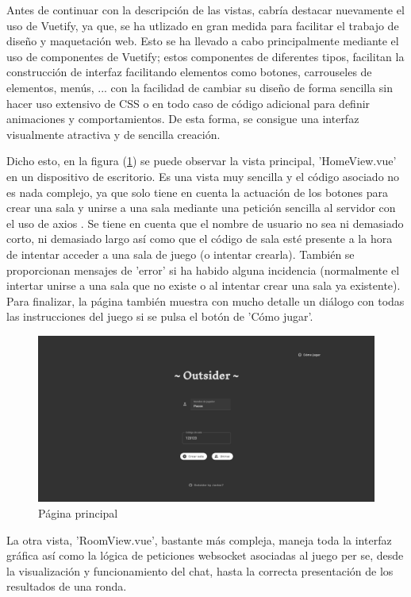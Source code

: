 Antes de continuar con la descripción de las vistas, cabría destacar nuevamente el uso de Vuetify, ya que, se ha utlizado en gran medida para facilitar 
el trabajo de diseño y maquetación web. Esto se ha llevado a cabo principalmente mediante el uso de componentes de Vuetify; estos componentes de diferentes tipos, facilitan la
construcción de interfaz facilitando elementos como botones, carrouseles de elementos, menús, ... con la facilidad de cambiar su diseño de forma sencilla sin hacer uso
extensivo de CSS o en todo caso de código adicional para definir animaciones y comportamientos. De esta forma, se consigue una interfaz visualmente atractiva y de sencilla
creación.

Dicho esto, en la figura (\ref{fig:res_mainpage}) se puede observar la vista principal, 'HomeView.vue' en un dispositivo de escritorio. Es una vista muy sencilla y el código asociado no
es nada complejo, ya que solo tiene en cuenta la actuación de los botones para crear una sala y unirse a una sala mediante una petición sencilla al servidor con el uso de axios \cite{vueAxios}. 
Se tiene en cuenta que el nombre de usuario no sea ni demasiado corto, ni demasiado largo así como que el código de sala esté presente a la hora de intentar acceder a una sala de juego 
(o intentar crearla). También se proporcionan mensajes de 'error' si ha habido alguna incidencia (normalmente el intertar unirse a una sala que no existe o al intentar crear una sala ya existente). 
Para finalizar, la página también muestra con mucho detalle un diálogo con todas las instrucciones del juego si se pulsa el botón de 'Cómo jugar'.

\begin{figure}[h]
	\centering
	\includegraphics[width=\textwidth,clip=true]{res_mainpage.png}
	\caption{Página principal}
	\label{fig:res_mainpage}
\end{figure}

La otra vista, 'RoomView.vue', bastante más compleja, maneja toda la interfaz gráfica así como la lógica de peticiones websocket asociadas al juego per se, desde la
visualización y funcionamiento del chat, hasta la correcta presentación de los resultados de una ronda.

